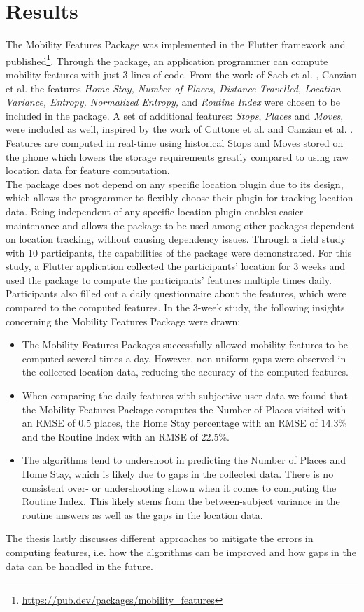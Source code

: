 \section{Results}
The Mobility Features Package was implemented in the Flutter framework and published\footnote{\url{https://pub.dev/packages/mobility_features}}. Through the package, an application programmer can compute mobility features with just 3 lines of code. From the work of Saeb et al. \cite{Saeb2015}, Canzian et al. \cite{Canzian2015} the features \textit{Home Stay, Number of Places, Distance Travelled, Location Variance, Entropy, Normalized Entropy,} and \textit{Routine Index} were chosen to be included in the package. A set of additional features: \textit{Stops}, \textit{Places} and \textit{Moves}, were included as well, inspired by the work of Cuttone et al. \cite{sparse-location-2014} and Canzian et al. \cite{Canzian2015}. Features are computed in real-time using historical Stops and Moves stored on the phone which lowers the storage requirements greatly compared to using raw location data for feature computation.\\

The package does not depend on any specific location plugin due to its design, which allows the programmer to flexibly choose their plugin for tracking location data. Being independent of any specific location plugin enables easier maintenance and allows the package to be used among other packages dependent on location tracking, without causing dependency issues. Through a field study with 10 participants, the capabilities of the package were demonstrated. For this study, a Flutter application collected the participants' location for 3 weeks and used the package to compute the participants' features multiple times daily. Participants also filled out a daily questionnaire about the features, which were compared to the computed features. In the 3-week study, the following insights concerning the Mobility Features Package were drawn:

\begin{itemize}
    \item The Mobility Features Packages successfully allowed mobility features to be computed several times a day. However, non-uniform gaps were observed in the collected location data, reducing the accuracy of the computed features. 
    
    \item When comparing the daily features with subjective user data we found that the Mobility Features Package computes the Number of Places visited with an RMSE of 0.5 places, the Home Stay percentage with an RMSE of 14.3\% and the Routine Index with an RMSE of 22.5\%.
    
    \item The algorithms tend to undershoot in predicting the Number of Places and Home Stay, which is likely due to gaps in the collected data. There is no consistent over- or undershooting shown when it comes to computing the Routine Index. This likely stems from the between-subject variance in the routine answers as well as the gaps in the location data.
\end{itemize}

The thesis lastly discusses different approaches to mitigate the errors in computing features, i.e. how the algorithms can be improved and how gaps in the data can be handled in the future. 